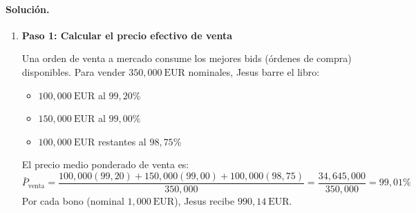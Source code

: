 \documentclass[12pt,a4paper]{article}
\newcommand{\EUR}[1]{\ensuremath{#1~\text{EUR}}}
\newenvironment{solucion}{\paragraph{Solución.}}{}
\begin{document}
\begin{solucion}
\begin{enumerate}[label=\alph*)]
  El desembolso inicial efectivo fue de \EUR{1{,}023{,}68} por bono (precio de \(101{,}16\%\) del nominal más cupón corrido de \EUR{12{,}08}). La TIR anual \(y\) es la tasa de descuento que iguala el valor presente de todos los flujos futuros con este desembolso inicial:
  
  \begin{align*}
  1{,}023{,}68 &= \frac{36{,}25}{(1+y)^{2/12}} + \frac{36{,}25}{(1+y)^{5/12}} + \frac{36{,}25}{(1+y)^{8/12}} + \frac{36{,}25}{(1+y)^{11/12}}\\
  &\quad + \frac{36{,}25}{(1+y)^{14/12}} + \frac{36{,}25}{(1+y)^{17/12}} + \frac{36{,}25}{(1+y)^{20/12}} + \frac{36{,}25}{(1+y)^{23/12}}\\
  &\quad + \frac{36{,}25}{(1+y)^{26/12}} + \frac{36{,}25}{(1+y)^{29/12}} + \frac{36{,}25}{(1+y)^{32/12}} + \frac{1{,}036{,}25}{(1+y)^{35/12}}
  \end{align*}
  
  De forma compacta:
  \[
  1{,}023{,}68 = \sum_{k=1}^{11} \frac{36{,}25}{(1+y)^{(3k-1)/12}} + \frac{1{,}036{,}25}{(1+y)^{35/12}}
  \]
  
  donde \((3k-1)\) genera la secuencia \(2, 5, 8, 11, \ldots, 32\) que representa los meses hasta cada cupón.
  
  \textbf{Nota práctica:} Esta ecuación no tiene solución cerrada y debe resolverse numéricamente (mediante Newton-Raphson o tanteo). El cupón anual nominal del \(14{,}5\%\) y el precio ligeramente superior al par sugieren que la TIR será cercana pero algo inferior al \(14{,}5\%\), ajustada por el momento exacto de cada pago.
  \item \textbf{Paso 1: Calcular el precio efectivo de venta}
  
  Una orden de venta a mercado consume los mejores bids (órdenes de compra) disponibles. Para vender \EUR{350{,}000} nominales, Jesus barre el libro:
  \begin{itemize}
    \item \EUR{100{,}000} al \(99{,}20\%\)
    \item \EUR{150{,}000} al \(99{,}00\%\)
    \item \EUR{100{,}000} restantes al \(98{,}75\%\)
  \end{itemize}
  
  El precio medio ponderado de venta es:
  \[
  \bar{P}_{\text{venta}} = \frac{100{,}000(99{,}20) + 150{,}000(99{,}00) + 100{,}000(98{,}75)}{350{,}000} = \frac{34{,}645{,}000}{350{,}000} = 99{,}01\% 
  \]
  Por cada bono (nominal \EUR{1{,}000}), Jesus recibe \EUR{990{,}14}.
  

\end{enumerate}
\end{solucion}
\end{document}
